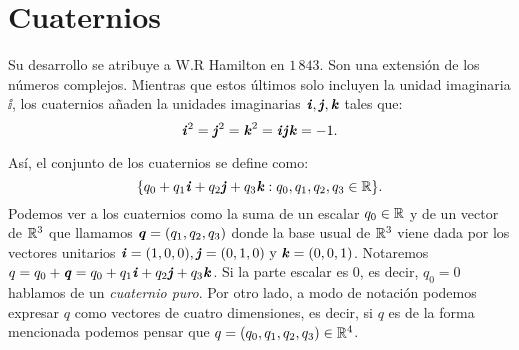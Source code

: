 	\section{Cuaternios}
		Su desarrollo se atribuye a W.R Hamilton en $ 1\,843 $.  Son una extensión de los números complejos. Mientras que estos últimos solo incluyen la unidad imaginaria $ \ii$, los cuaternios añaden la unidades imaginarias $ \textbf{\emph{i}}, \textbf{\emph{j}}, \textbf{\emph{k}} $ tales que:
		\begin{equation*}
			\textbf{\emph{i}}^2 = \textbf{\emph{j}}^2 = \textbf{\emph{k}}^2 = \textbf{\emph{i}}\textbf{\emph{j}}\textbf{\emph{k}} = -1.
		\end{equation*} 
		
		Así, el conjunto de los cuaternios se define como:
		\begin{equation*} 
			\lbrace q_0 + q_1 \textbf{\emph{i}} + q_2 \textbf{\emph{j}} + q_3 \textbf{\emph{k}} : q_0, q_1, q_2, q_3 \in \mathbb{R} \rbrace.
		\end{equation*}
		Podemos ver a los cuaternios como la suma de un escalar $ q_0 \in \mathbb{R}$ y de un vector de $ \mathbb{R}^3 $ que llamamos $ \textbf{\emph{q}} = (q_1,q_2,q_3)$ donde la base usual de $ \mathbb{R}^3 $ viene dada por los vectores unitarios $ \textbf{\emph{i}} =(1,0,0), \textbf{\emph{j}} = (0,1,0) \text{ y } \textbf{\emph{k}} = (0,0,1)$. Notaremos $
		q = q_0 + \textbf{\emph{q}} =  q_0 + q_1 \textbf{\emph{i}} + q_2 \textbf{\emph{j}} + q_3 \textbf{\emph{k}} $. Si la parte escalar es 0, es decir, $ q_0 = 0 $ hablamos de un \textit{cuaternio puro}. Por otro lado, a modo de notación podemos expresar $ q $ como vectores de cuatro dimensiones, es decir, si $ q $ es de la forma mencionada podemos pensar que $ q = (q_0, q_1, q_2, q_3) \in \mathbb{R}^4 $.
		
